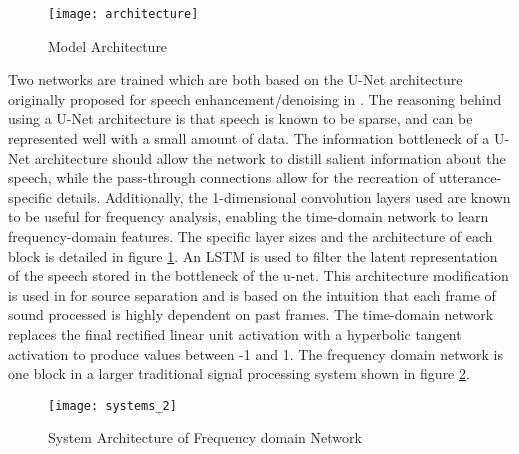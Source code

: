 \begin{figure}[h]
\begin{center}
	\texttt{[image: architecture]}
	\caption{Model Architecture}
	\label{fig:architecture}
\end{center}
\end{figure}

\noindent Two networks are trained which are both based on the U-Net architecture originally proposed for speech enhancement/denoising in \cite{pandey_new_2019}.  The reasoning behind using a U-Net architecture is that speech is known to be sparse, and can be represented well with a small amount of data. The information bottleneck of a U-Net architecture should allow the network to distill salient information about the speech, while the pass-through connections allow for the recreation of utterance-specific details. Additionally, the 1-dimensional convolution layers used are known to be useful for frequency analysis, enabling the time-domain network to learn frequency-domain features. The specific layer sizes and the architecture of each block is detailed in figure \ref{fig:architecture}. An \ac{LSTM} is used to filter the latent representation of the speech stored in the bottleneck of the u-net. This architecture modification is used in  for source separation and is based on the intuition that each frame of sound processed is highly dependent on past frames. The time-domain network replaces the final rectified linear unit activation with a hyperbolic tangent activation to produce values between -1 and 1. The frequency domain network is one block in a larger traditional signal processing system shown in figure \ref{fig:systems}.

\begin{figure}[h]
	\centering
	\texttt{[image: systems\_2]}
	\caption{System Architecture of Frequency domain Network}
	\label{fig:systems}
\end{figure}
